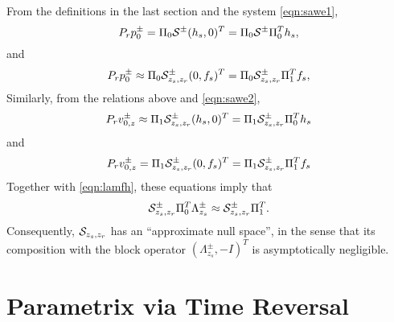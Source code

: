 From the definitions in the last section and the system \ref{eqn:sawe1},
\begin{equation}
  \label{eqn:pident0}
P_r p^{\pm}_0 = \Pi_0{\cal S}^{\pm}(h_s,0)^T = \Pi_0{\cal
  S}^{\pm}\Pi_0^Th_s,
\end{equation}
and
\begin{equation}
  \label{eqn:pident1}
P_r p^{\pm}_0 \approx \Pi_0{\cal S}^{\pm}_{z_s,z_r} (0,f_s)^T = \Pi_0{\cal
  S}^{\pm}_{z_s,z_r} \Pi_1^Tf_s,
\end{equation}
Similarly, from the relations above and \ref{eqn:sawe2},
\begin{equation}
  \label{eqn:vident0}
  P_r  v^{\pm}_{0,z}  \approx \Pi_1{\cal S}^{\pm}_{z_s,z_r}(h_s,0)^T  =
  \Pi_1{\cal S}^{\pm}_{z_s,z_r} \Pi_0^Th_s 
\end{equation}
and
\begin{equation}
  \label{eqn:vident1}
  P_r  v^{\pm}_{0,z}  = \Pi_1{\cal S}^{\pm}_{z_s,z_r}(0,f_s)^T  =
  \Pi_1{\cal S}^{\pm}_{z_s,z_r} \Pi_1^Tf_s 
\end{equation}
Together with \ref{eqn:lamfh}, these equations imply that
\begin{equation}
  \label{eqn:lamnull}
{\cal  S}_{z_s,z_r}^{\pm}\Pi_0^T\Lambda^{\pm}_{z_s} \approx {\cal S}^{\pm}_{z_s,z_r}\Pi_1^T.
\end{equation}
Consequently, ${\cal S}_{z_s,z_r}$ has an ``approximate null space'',
in the sense that its composition with the block operator
$(\Lambda^{\pm}_{z_s},-I)^T$ is asymptotically negligible.

\section{Parametrix via Time Reversal}


